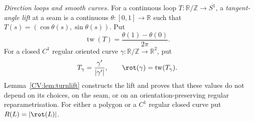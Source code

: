 \begin{definition}
\emph{Direction loops and smooth curves.}
For a continuous loop $T\colon\mathbb R/\mathbb Z\to S^1$, a
\emph{tangent-angle lift} at a seam is a continuous
$\theta\colon[0,1]\to\mathbb R$ such that
$T(s)=(\cos\theta(s),\sin\theta(s))$. Put
\[
   \operatorname{tw}(T)=\frac{\theta(1)-\theta(0)}{2\pi}.
\]
For a closed $C^1$ regular oriented curve
$\gamma\colon\mathbb R/\mathbb Z\to\mathbb R^2$, put
\[
   T_\gamma=\frac{\gamma'}{|\gamma'|},
   \qquad
   \rot(\gamma)=\operatorname{tw}(T_\gamma).
\]
Lemma~\ref{CV:lem:turnlift} constructs the lift and proves that these values do
not depend on its choices, on the seam, or on an orientation-preserving regular
reparametrisation. For either a polygon or a $C^1$ regular closed curve put
$R(L)=|\rot(L)|$.

\end{definition}

